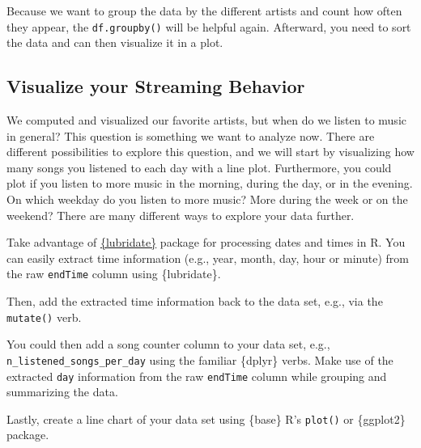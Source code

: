 \documentclass[
  11pt,
]{book}
\newenvironment{tips}[1]
  {
  \begin{itemize}
  \footnotesize
  \renewcommand{\labelitemi}{
    \raisebox{-.7\height}[0pt][0pt]{
      {\setkeys{Gin}{width=3em,keepaspectratio}
        \texttt{[image: images/\#1.png]}}
    }
  }
  \setlength{\fboxsep}{1em}
  \begin{rbox}
  \item
  }
  {
  \end{rbox}
  \end{itemize}
  }
\newenvironment{tipsp}[1]
  {
  \begin{itemize}
  \footnotesize
  \renewcommand{\labelitemi}{
    \raisebox{-.7\height}[0pt][0pt]{
      {\setkeys{Gin}{width=3em,keepaspectratio}
        \texttt{[image: images/\#1.png]}}
    }
  }
  \setlength{\fboxsep}{1em}
  \begin{pbox}
  \item
  }
  {
  \end{pbox}
  \end{itemize}
  }
\begin{document}
\begin{tipsp}p

Because we want to group the data by the different artists and count how often they appear, the \texttt{df.groupby()} will be helpful again.
Afterward, you need to sort the data and can then visualize it in a plot.

\end{tipsp}

\hypertarget{visualize-your-streaming-behavior}{%
\subsection{Visualize your Streaming Behavior}\label{visualize-your-streaming-behavior}}

We computed and visualized our favorite artists, but when do we listen to music in general? This question is something we want to analyze now. There are different possibilities to explore this question, and we will start by visualizing how many songs you listened to each day with a line plot. Furthermore, you could plot if you listen to more music in the morning, during the day, or in the evening. On which weekday do you listen to more music? More during the week or on the weekend? There are many different ways to explore your data further.

\begin{tips}r

Take advantage of \href{https://lubridate.tidyverse.org}{\{lubridate\}} package for processing dates and times in R. You can easily extract time information (e.g., year, month, day, hour or minute) from the raw \texttt{endTime} column using \{lubridate\}.

Then, add the extracted time information back to the data set, e.g., via the \texttt{mutate()} verb.

You could then add a song counter column to your data set, e.g., \texttt{n\_listened\_songs\_per\_day} using the familiar \{dplyr\} verbs. Make use of the extracted \texttt{day} information from the raw \texttt{endTime} column while grouping and summarizing the data.

Lastly, create a line chart of your data set using \{base\} R's \texttt{plot()} or \{ggplot2\} package.

\end{tips}
\end{document}
